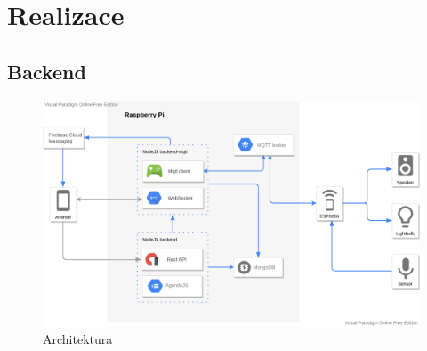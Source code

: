 \chapter{Realizace}


\section{Backend}
\begin{figure}[htbp]
    \centering
    \includegraphics[width=\textwidth]{img/architecture.pdf}
    \caption{Architektura}
\end{figure}

